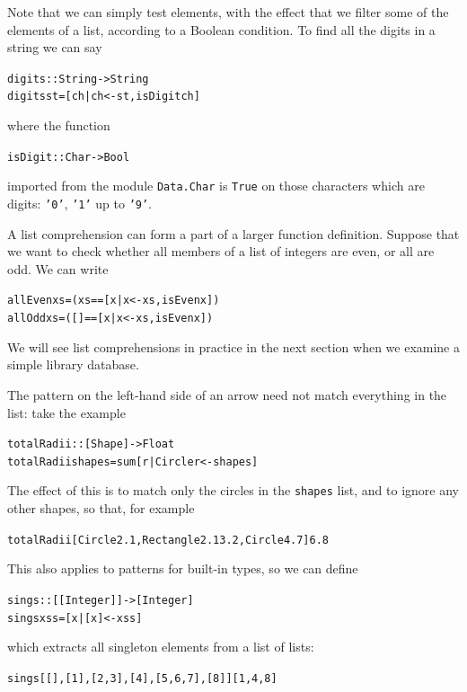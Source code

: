 \begin{example}
Note that we can simply test elements, with the
effect that we filter some of the elements of a list, according to a
Boolean condition. To find all the digits in a string we can say
\begin{alltt}
digits :: String -> String
digits st = [ ch | ch<-st , isDigit ch ] 
\end{alltt}
where the function
\begin{alltt}
isDigit :: Char -> Bool
\end{alltt}
imported from the module \texttt{Data.Char} is \texttt{True} on those characters which are digits: \texttt{'0'},
\texttt{'1'} up to \texttt{'9'}.

A list comprehension can form a part of a larger function definition.
Suppose that we want to check whether all members of a list of integers
are even, or all are odd. We can write
\begin{alltt}
allEven xs = (xs == [x | x<-xs, isEven x])
allOdd xs  = ([] == [x | x<-xs, isEven x])
\end{alltt}
We will see list comprehensions in practice in the next section when we
examine a simple library database.


The pattern on the left-hand side of an arrow need not match everything in the list: take the example
\begin{alltt}
totalRadii :: [Shape] -> Float
totalRadii shapes = sum [r | Circle r <- shapes]
\end{alltt}
The effect of this is to match only the circles in the \texttt{shapes} list, and to ignore any other shapes, so that, for example
\begin{alltt}
totalRadii [Circle 2.1, Rectangle 2.1 3.2, Circle 4.7] \step{}6.8
\end{alltt}
This also applies to patterns for built-in types, so we can define
\begin{alltt}
sings :: [[Integer]] -> [Integer]
sings xss = [x | [x] <-xss ]
\end{alltt}
which extracts all singleton elements from a list of lists:
\begin{alltt}
sings [[],[1],[2,3],[4],[5,6,7],[8]] \step{}[1,4,8]
\end{alltt}

\end{example}
